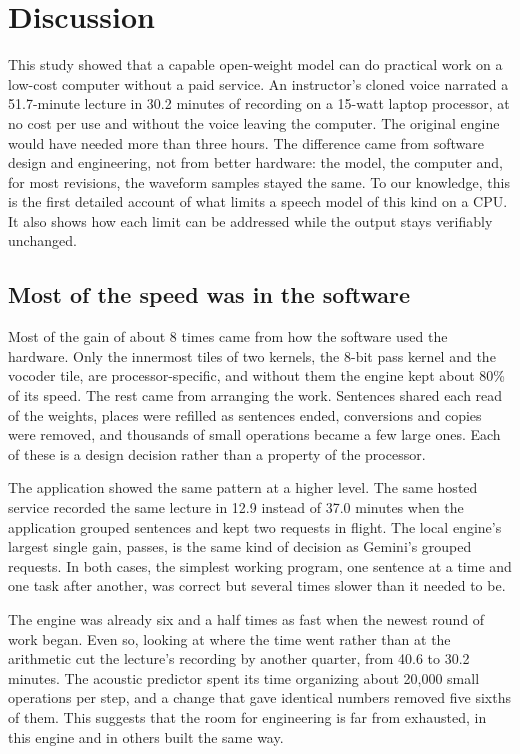 \documentclass[11pt]{article}
\begin{document}
\hypertarget{discussion}{%
\section{Discussion}\label{discussion}}

This study showed that a capable open-weight model can do practical work
on a low-cost computer without a paid service. An instructor's cloned
voice narrated a 51.7-minute lecture in 30.2 minutes of recording on a
15-watt laptop processor, at no cost per use and without the voice
leaving the computer. The original engine would have needed more than
three hours. The difference came from software design and engineering,
not from better hardware: the model, the computer and, for most
revisions, the waveform samples stayed the same. To our knowledge, this
is the first detailed account of what limits a speech model of this kind
on a CPU. It also shows how each limit can be addressed while the output
stays verifiably unchanged.

\hypertarget{most-of-the-speed-was-in-the-software}{%
\subsection{Most of the speed was in the
software}\label{most-of-the-speed-was-in-the-software}}

Most of the gain of about 8 times came from how the software used the
hardware. Only the innermost tiles of two kernels, the 8-bit pass kernel
and the vocoder tile, are processor-specific, and without them the
engine kept about 80\% of its speed. The rest came from arranging the
work. Sentences shared each read of the weights, places were refilled as
sentences ended, conversions and copies were removed, and thousands of
small operations became a few large ones. Each of these is a design
decision rather than a property of the processor.

The application showed the same pattern at a higher level. The same
hosted service recorded the same lecture in 12.9 instead of 37.0 minutes
when the application grouped sentences and kept two requests in flight.
The local engine's largest single gain, passes, is the same kind of
decision as Gemini's grouped requests. In both cases, the simplest
working program, one sentence at a time and one task after another, was
correct but several times slower than it needed to be.

The engine was already six and a half times as fast when the newest
round of work began. Even so, looking at where the time went rather than
at the arithmetic cut the lecture's recording by another quarter, from
40.6 to 30.2 minutes. The acoustic predictor spent its time organizing
about 20,000 small operations per step, and a change that gave identical
numbers removed five sixths of them. This suggests that the room for
engineering is far from exhausted, in this engine and in others built
the same way.
\end{document}
